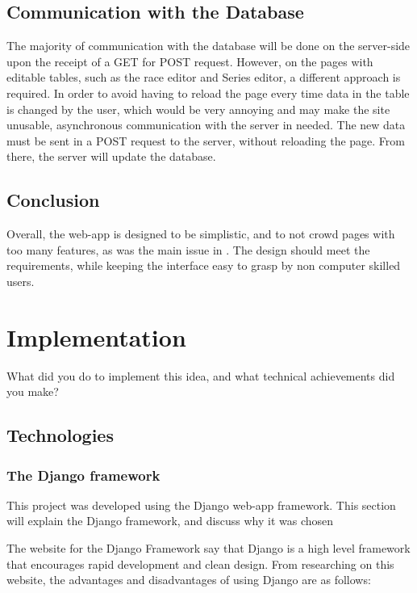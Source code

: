 \documentclass{l4proj}
\begin{document}
\section{Communication with the Database}

The majority of communication with the database will be done on the server-side upon the receipt of a GET for POST request. However, on the pages with editable tables, such as the race editor and Series editor, a different approach is required. In order to avoid having to reload the page every time data in the table is changed by the user, which would be very annoying and may make the site unusable, asynchronous communication with the server in needed. The new data must be sent in a POST request to the server, without reloading the page. From there, the server will update the database.

\section{Conclusion}

Overall, the web-app is designed to be simplistic, and to not crowd pages with too many features, as was the main issue in \citet{sailwave}. The design should meet the requirements, while keeping the interface easy to grasp by non computer skilled users.


\chapter{Implementation}\label{chap:imp}
What did you do to implement this idea, and what technical achievements did you make?
\section{Technologies}

\subsection{The Django framework}
This project was developed using the Django web-app framework. This section will explain the Django framework, and discuss why it was chosen

The website for the Django Framework \citep{django} say that Django is a high level framework that encourages rapid development and clean design. From researching on this website, the advantages and disadvantages of using Django are as follows:
\end{document}
